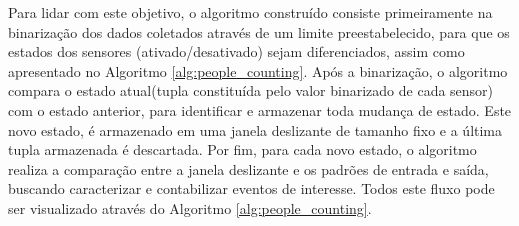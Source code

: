 Para lidar com este objetivo, o algoritmo construído consiste primeiramente na binarização dos dados coletados através de um limite preestabelecido, para que os estados dos sensores (ativado/desativado) sejam diferenciados, assim como apresentado no Algoritmo \ref{alg:people_counting}. Após a binarização, o algoritmo compara o estado atual(tupla constituída pelo valor binarizado de cada sensor) com o estado anterior, para identificar e armazenar toda mudança de estado. Este novo estado, é armazenado em uma janela deslizante de tamanho fixo e a última tupla armazenada é descartada. Por fim, para cada novo estado, o algoritmo realiza a comparação entre a janela deslizante e os padrões de entrada e saída, buscando caracterizar e contabilizar eventos de interesse. Todos este fluxo pode ser visualizado através do Algoritmo \ref{alg:people_counting}.




